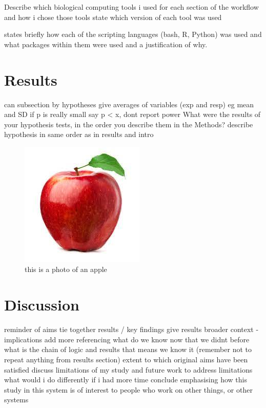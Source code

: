 \documentclass[11pt, titlepage]{article}
\begin{document}
    Describe which biological computing tools i used for each section of the workflow and how i chose those tools
    state which version of each tool was used
    
    states briefly how each of the scripting languages (bash, R, Python) was used and what packages within them were used and a justification of why.

    \section*{Results}

    can subsection by hypotheses
    give averages of variables (exp and resp) eg mean and SD
    if p is really small say p < x, dont report power
    What  were  the  results of  your hypothesis  tests,  in  the  order  you describe  them  in  the Methods?
    describe hypothesis in same order as in results and intro

    \begin{figure}[H]
    \centering
    \includegraphics[scale=0.75]{../data/index.jpeg}
    \caption{this is a photo of an apple }
    \end{figure}

    \section*{Discussion}

    reminder of aims
    tie together results / key findings
    give results broader context - implications
    add more referencing
    what do we know now that we didnt before
    what is the chain of logic and results that means we know it (remember not to repeat anything from results section)
    extent to which original aims have been satisfied
    discuss limitations of my study and future work to address limitations
    what would i do differently if i had more time
    conclude emphasising how this study in this system is of interest to people who work on other things, or other systems

    

    
\end{document}
